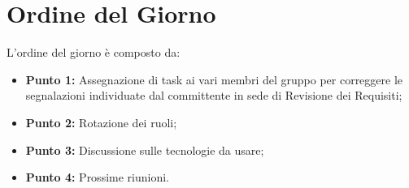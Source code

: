 \section{Ordine del Giorno}
L'ordine del giorno è composto da: 
\begin{itemize}
	\item \textbf{Punto 1:} Assegnazione di task ai vari membri del gruppo per correggere le segnalazioni individuate dal committente in sede di Revisione dei Requisiti;
	\item \textbf{Punto 2:} Rotazione dei ruoli;
	\item \textbf{Punto 3:} Discussione sulle tecnologie da usare;
	\item \textbf{Punto 4:} Prossime riunioni.
\end{itemize}
